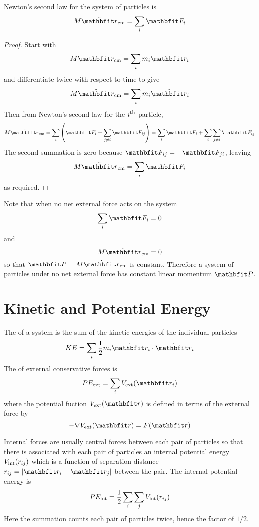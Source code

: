 \begin{theorem}
Newton's second law for the system of particles is
$$M\ddot{\vect{r}}_{\rm cm}=\sum_i\vect{F}_i$$
\end{theorem}
\begin{proof}
Start with
$$M\vect{r}_{\rm cm}=\sum_i m_i\vect{r}_i$$
and differentiate twice with respect to time to give
$$M\ddot{\vect{r}}_{\rm cm}=\sum_i m_i\ddot{\vect{r}}_i$$
Then from Newton's second law for the $i^{\rm th}$ particle,
$$M\ddot{\vect{r}}_{\rm cm}
=\sum_i\left(\vect{F}_i+\sum_{j\neq i}\vect{F}_{ij}\right)
=\sum_i\vect{F}_i+\sum_i\sum_{j\neq i}\vect{F}_{ij}$$
The second summation is zero because $\vect{F}_{ij}=-\vect{F}_{ji}$, leaving
$$M\ddot{\vect{r}}_{\rm cm}=\sum_i\vect{F}_i$$
as required.
\end{proof}

Note that when no net external force acts on the system
$$\sum_i\vect{F}_i=0$$
and
$$M\ddot{\vect{r}}_{\rm cm}=0$$
so that $\vect{P}=M\dot{\vect{r}}_{\rm cm}$ is constant.  Therefore a system
of particles under no net external force has constant linear momentum
$\vect{P}$.

\section{Kinetic and Potential Energy}

The  of a system is the sum of the kinetic energies of
the individual particles
$$KE=\sum_i\frac{1}{2}m_i\dot{\vect{r}}_i\cdot\dot{\vect{r}}_i$$
The  of external conservative forces is
$$PE_{\rm ext}=\sum_iV_{\rm ext}(\vect{r}_i)$$
where the potential fuction $V_{\rm ext}(\vect{r})$ is defined in terms of
the external force by
$$-\grad V_{\rm ext}(\vect{r})=F(\vect{r})$$

Internal forces are usually central forces between each pair of particles so
that there is associated with each pair of particles an internal potential
energy $V_{\rm int}(r_{ij})$ which is a function of separation distance
$r_{ij}=\left|\vect{r}_i-\vect{r}_j\right|$ between the pair.  The internal
potential energy is
$$PE_{\rm int}=\frac{1}{2}\sum_i\sum_j V_{\rm int}(r_{ij})$$
Here the summation counts each pair of particles twice, hence the factor of
$1/2$.

